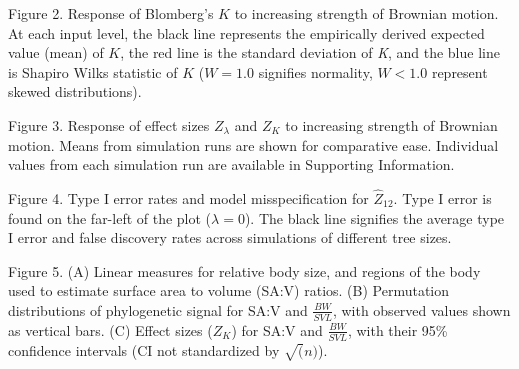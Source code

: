 \documentclass[
]{article}
\begin{document}
Figure 2. Response of Blomberg's \(K\) to increasing strength of
Brownian motion. At each input level, the black line represents the
empirically derived expected value (mean) of \(K\), the red line is the
standard deviation of \emph{K}, and the blue line is Shapiro Wilks
statistic of \(K\) (\(W=1.0\) signifies normality, \(W< 1.0\) represent
skewed distributions). \hfill\break

Figure 3. Response of effect sizes \(Z_\lambda\) and \(Z_K\) to
increasing strength of Brownian motion. Means from simulation runs are
shown for comparative ease. Individual values from each simulation run
are available in Supporting Information. \hfill\break

Figure 4. Type I error rates and model misspecification for
\(\hat{Z}_{12}\). Type I error is found on the far-left of the plot
(\(\lambda = 0\)). The black line signifies the average type I error and
false discovery rates across simulations of different tree sizes.

Figure 5. (A) Linear measures for relative body size, and regions of the
body used to estimate surface area to volume (SA:V) ratios. (B)
Permutation distributions of phylogenetic signal for SA:V and
\(\frac{BW}{SVL}\), with observed values shown as vertical bars. (C)
Effect sizes (\(Z_K\)) for SA:V and \(\frac{BW}{SVL}\), with their 95\%
confidence intervals (CI not standardized by \(\sqrt(n)\)). \hfill\break

\newpage
\end{document}
